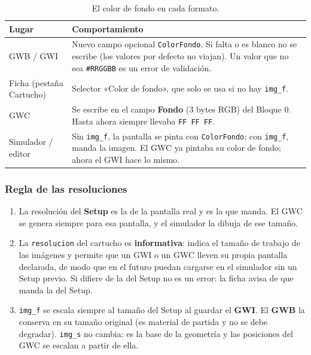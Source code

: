 \begin{table}[htbp]
	\centering
	\begin{tabularx}{\textwidth}{l >{\RaggedRight\arraybackslash}X}
		\toprule
		\textbf{Lugar} & \textbf{Comportamiento} \\
		\midrule
		GWB / GWI & Nuevo campo opcional \texttt{ColorFondo}. Si falta o es blanco no se escribe (los valores por defecto no viajan). Un valor que no sea \texttt{\#RRGGBB} es un error de validación. \\
		Ficha (pestaña Cartucho) & Selector «Color de fondo», que solo se usa si no hay \texttt{img\_f}. \\
		GWC & Se escribe en el campo \textbf{Fondo} (3 bytes RGB) del Bloque 0. Hasta ahora siempre llevaba \texttt{FF FF FF}. \\
		Simulador / editor & Sin \texttt{img\_f}, la pantalla se pinta con \texttt{ColorFondo}; con \texttt{img\_f}, manda la imagen. El GWC ya pintaba su color de fondo; ahora el GWI hace lo mismo. \\
		\bottomrule
	\end{tabularx}
	\caption{El color de fondo en cada formato.}
\end{table}

\subsubsection{Regla de las resoluciones}

\begin{enumerate}
	\item La resolución del \textbf{Setup} es la de la pantalla real y es la que manda. El GWC se genera siempre para esa pantalla, y el simulador la dibuja de ese tamaño.
	
	\item La \texttt{resolucion} del cartucho es \textbf{informativa}: indica el tamaño de trabajo de las imágenes y permite que un GWI o un GWC lleven su propia pantalla declarada, de modo que en el futuro puedan cargarse en el simulador sin un Setup previo. Si difiere de la del Setup no es un error: la ficha avisa de que manda la del Setup.
	
	\item \texttt{img\_f} se escala siempre al tamaño del Setup al guardar el \textbf{GWI}. El \textbf{GWB} la conserva en su tamaño original (es material de partida y no se debe degradar). \texttt{img\_s} no cambia: es la base de la geometría y las posiciones del GWC se escalan a partir de ella.
\end{enumerate}

